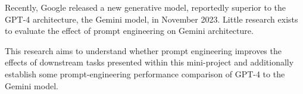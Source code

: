 Recently, Google released a new generative model, reportedly superior to the GPT-4 architecture, the Gemini model, in November 2023. Little research exists to evaluate the effect of prompt engineering on Gemini architecture.  

This research aims to understand whether prompt engineering improves the effects of downstream tasks presented within this mini-project and additionally establish some prompt-engineering performance comparison of GPT-4 to the Gemini model. 